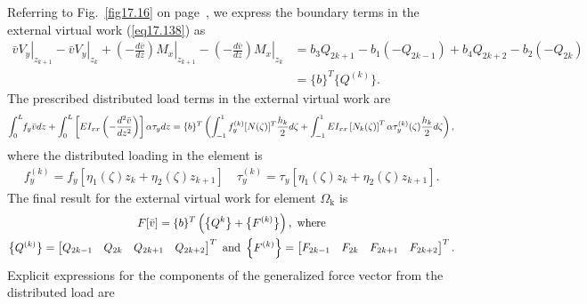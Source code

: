 \documentclass{AeroStructure-ERJohnson}
\begin{document}
\vspace*{-1pc}

Referring to Fig.~\ref{fig17.16} on page~\pageref{fig17.16}, we express the boundary terms in the external virtual work (\ref{eq17.138}) as
\begin{align}
\left.\bar{v} V_{y}\right|_{z_{k+1}}-\left.\bar{v} V_{y}\right|_{z_{k}}+\left.\left(-\frac{d \bar{v}}{d z}\right) M_{x}\right|_{z_{k+1}}-\left.\left(-\frac{d \bar{v}}{d z}\right) M_{x}\right|_{z_{k}}&=b_{3} Q_{2 k+1}-b_{1}\left(-Q_{2 k-1}\right)+b_{4} Q_{2 k+2}-b_{2}\left(-Q_{2 k}\right) \nonumber \\
&=\{b\}^{T}\big\{Q^{(k)}\big\}. \label{eq17.147}
\end{align}
The prescribed distributed load terms in the external virtual work are
\begin{align}\label{eq17.148}
\int_{0}^{L}\hspace*{-2.5pt} f_{y} \bar{v} d z+\int_{0}^{L}\left[E I_{x x}\left(-\frac{d^{2} \bar{v}}{d z^{2}}\right)\right] \alpha \tau_{y} d z=\{b\}^{T}\left(\int_{-1}^{1} f_{y}^{(k)}[N(\zeta)]^{T} \frac{h_{k}}{2} d \zeta+\int_{-1}^{1} E I_{x x}\left[N_{k}(\zeta)\right]^{T} \alpha \tau_{y}^{(k)}(\zeta) \frac{h_{k}}{2} d \zeta\right),
\end{align}
where the distributed loading in the element is
\begin{align}\label{eq17.149}
f_{y}^{(k)}=f_{y}\left[\eta_{1}(\zeta) z_{k}+\eta_{2}(\zeta) z_{k+1}\right] \quad \tau_{y}^{(k)}=\tau_{y}\left[\eta_{1}(\zeta) z_{k}+\eta_{2}(\zeta) z_{k+1}\right].
\end{align}
The final result for the external virtual work for element $\Omega_{\textrm{k}}$ is
\begin{gather}
F[\bar{v}]=\{b\}^{T}\left(\left\{Q^{k}\right\}+\big\{F^{(k)}\big\}\right), \textrm{ where}\label{eq17.150}\\
\big\{Q^{(k)}\big\}=\left[\begin{array}{@{}llll@{}}Q_{2 k-1} & Q_{2 k} & Q_{2 k+1} & Q_{2 k+2}\end{array}\right]^{T} \textrm{ and } \left\{F^{(k)}\right\}=\left[\begin{array}{@{}llll@{}}F_{2 k-1} &F_{2 k} &F_{2 k+1} &F_{2 k+2}\end{array}\right]^{T}. \label{eq17.151}
\end{gather}
Explicit expressions for the components of the generalized force vector from the distributed load are
\end{document}
